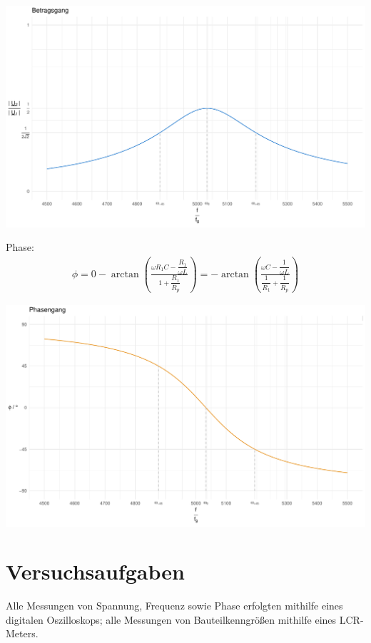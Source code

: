 \documentclass[a4paper, 12pt]{article}
\begin{document}
    \begin{center}
      \includegraphics[scale=0.5]{./R/2_7/2_7_betrag_clean.pdf}
    \end{center}

  Phase:
    \begin{gather*}
      \phi = 0 - \arctan{\left( \frac{\omega R_1 C - \dfrac{R_1}{\omega L}}{1+ \dfrac{R_1}{R_p}} \right)} = -\arctan{\left( \frac{\omega C - \dfrac{1}{\omega L}}{\dfrac{1}{R_1}+ \dfrac{1}{R_p}} \right)}
    \end{gather*}
    \vspace{0.021276873\paperheight}
    \begin{center}
      \includegraphics[scale=0.5]{./R/2_7/2_7_phase_clean.pdf}
    \end{center}

\pagebreak
\section{Versuchsaufgaben}
    Alle Messungen von Spannung, Frequenz sowie Phase erfolgten mithilfe eines digitalen Oszilloskops; alle Messungen von Bauteilkenngrößen mithilfe eines LCR-Meters.\\
\end{document}
